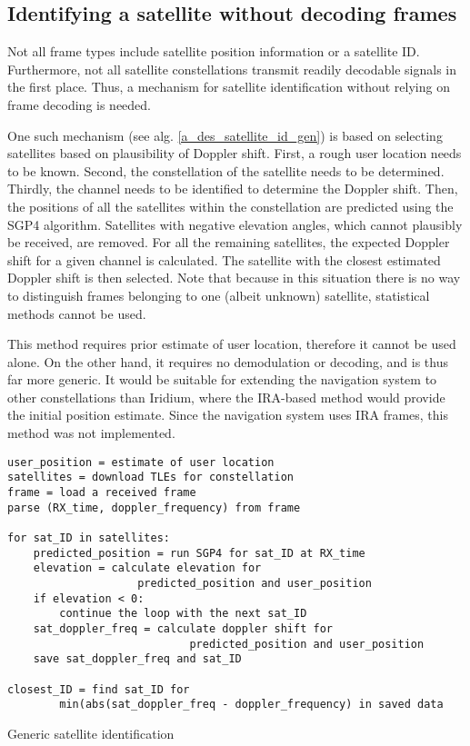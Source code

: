 \subsection{Identifying a satellite without decoding frames}
Not all frame types include satellite position information or a satellite ID. Furthermore, not all satellite constellations transmit readily decodable signals in the first place. Thus, a mechanism for satellite identification without relying on frame decoding is needed.

One such mechanism (see alg. \ref{a_des_satellite_id_gen}) is based on selecting satellites based on plausibility of Doppler shift. First, a rough user location needs to be known. Second, the constellation of the satellite needs to be determined. Thirdly, the channel needs to be identified to determine the Doppler shift. Then, the positions of all the satellites within the constellation are predicted using the SGP4 algorithm. Satellites with negative elevation angles, which cannot plausibly be received, are removed. For all the remaining satellites, the expected Doppler shift for a given channel is calculated. The satellite with the closest estimated Doppler shift is then selected. Note that because in this situation there is no way to distinguish frames belonging to one (albeit unknown) satellite, statistical methods cannot be used.

This method requires prior estimate of user location, therefore it cannot be used alone. On the other hand, it requires no demodulation or decoding, and is thus far more generic. It would be suitable for extending the navigation system to other constellations than Iridium, where the IRA-based method would provide the initial position estimate. Since the navigation system uses IRA frames, this method was not implemented.

\begin{algorithm}
    \centering
    \begin{verbatim}
user_position = estimate of user location
satellites = download TLEs for constellation
frame = load a received frame
parse (RX_time, doppler_frequency) from frame

for sat_ID in satellites:
    predicted_position = run SGP4 for sat_ID at RX_time
    elevation = calculate elevation for
                    predicted_position and user_position
    if elevation < 0:
        continue the loop with the next sat_ID
    sat_doppler_freq = calculate doppler shift for
                            predicted_position and user_position
    save sat_doppler_freq and sat_ID

closest_ID = find sat_ID for
        min(abs(sat_doppler_freq - doppler_frequency) in saved data
    \end{verbatim}
    \caption{Generic satellite identification}
    \label{a_des_satellite_id_gen}
\end{algorithm}


